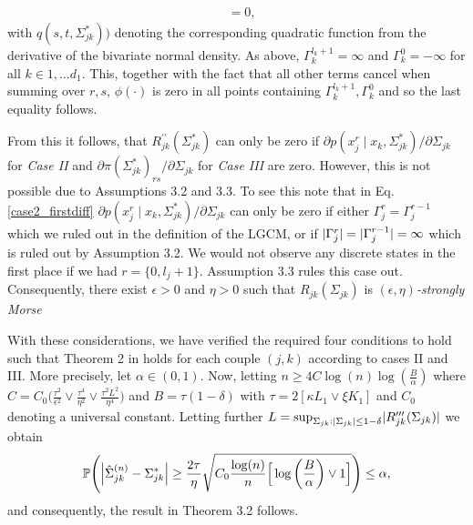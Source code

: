 \begin{condition}
\begin{condition}
\begin{align*}
             & = 0,
        \end{align*}
        with $q(s,t,\Sigma_{jk}^*))$ denoting the corresponding quadratic function from the derivative of the bivariate normal density. As above, $\Gamma_k^{l_k+1} = \infty$ and $\Gamma_k^0 = -\infty$ for all $k \in 1, \dots d_1$. This, together with the fact that all other terms cancel when summing over $r,s$, $\phi(\cdot)$ is zero in all points containing $\Gamma_k^{l_k+1}, \Gamma_k^0$ and so the last equality follows.

        From this it follows, that $R_{jk}^{\prime\prime}(\Sigma_{jk}^*)$ can only be zero if $\partial p(x_j^{r} \mid x_{k}, \Sigma_{jk}^*) / \partial \Sigma_{jk}$ for \textit{Case II} and $\partial \pi(\Sigma_{jk}^*)_{rs}/\partial \Sigma_{jk}$ for \textit{Case III} are zero. However, this is not possible due to Assumptions 3.2 and 3.3.
        To see this note that in Eq. \eqref{case2_firstdiff} $\partial p(x_j^{r} \mid x_{k}, \Sigma_{jk}^*) / \partial \Sigma_{jk}$ can only be zero if either ${\Gamma}^r_j = {\Gamma}^{r-1}_j$ which we ruled out in the definition of the LGCM, or if $\lvert{\Gamma}^r_j\rvert = \lvert{\Gamma}^{r-1}_j\rvert = \infty$ which is ruled out by Assumption 3.2.
        We would not observe any discrete states in the first place if we had $r=\{0,l_{j}+1\}$. Assumption 3.3
        rules this case out.
        Consequently, there exist $\epsilon > 0$ and $\eta > 0$ such that $R_{jk}(\Sigma_{jk})$ is $(\epsilon,\eta)$\textit{-strongly Morse}
    \end{condition}
\end{condition}

With these considerations, we have verified the required four conditions to hold such that Theorem 2 in \citet{Mei18} %
holds for each couple $(j,k)$ according to cases II and III. More precisely, let $\alpha \in (0,1)$. Now, letting  $n \geq 4 C \log(n) \log(\frac{B}{\alpha})$
where $C = C_0 \Big(\frac{\tau^2}{\epsilon^2} \vee \frac{\tau^4}{\eta^2} \vee \frac{\tau^2L^2}{\eta^4} \Big)$ and $B = \tau(1-\delta)$
with $\tau = 2 [\kappa L_1 \vee \xi K_1]$  and $C_0$ denoting a universal constant. Letting further $L = \sup_{\Sigma_{jk}: \lvert\Sigma_{jk}\rvert \leq 1- \delta} \lvert R_{jk}^{\prime\prime\prime}(\Sigma_{jk})\rvert$ we obtain
\begin{equation}\label{individual_bound}
    \mathbb{P}\Bigg( \abs{\hat{\Sigma}^{(n)}_{jk} - \Sigma_{jk}^*} \geq \frac{2\tau}{\eta}\sqrt{C_0\frac{\log(n)}{n}\Big[\log\bigg(\frac{B}{\alpha}\bigg) \vee 1\Big] } \Bigg) \leq \alpha,
\end{equation}
and consequently, the result in Theorem 3.2
follows.


